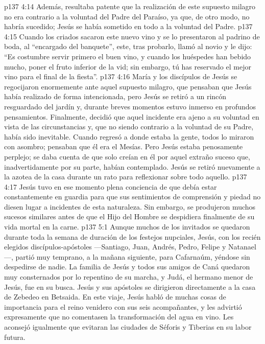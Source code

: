 \vs p137 4:14 Además, resultaba patente que la realización de este supuesto milagro no era contrario a la voluntad del Padre del Paraíso, ya que, de otro modo, no habría sucedido; Jesús se había sometido en todo a la voluntad del Padre.
\vs p137 4:15 \pc Cuando los criados sacaron este nuevo vino y se lo presentaron al padrino de boda, al “encargado del banquete”, este, tras probarlo, llamó al novio y le dijo: “Es costumbre servir primero el buen vino, y cuando los huéspedes han bebido mucho, poner el fruto inferior de la vid; sin embargo, tú has reservado el mejor vino para el final de la fiesta”.
\vs p137 4:16 María y los discípulos de Jesús se regocijaron enormemente ante aquel supuesto milagro, que pensaban que Jesús había realizado de forma intencionada, pero Jesús se retiró a un rincón resguardado del jardín y, durante breves momentos estuvo inmerso en profundos pensamientos. Finalmente, decidió que aquel incidente era ajeno a su voluntad en vista de las circunstancias y, que no siendo contrario a la voluntad de su Padre, había sido inevitable. Cuando regresó a donde estaba la gente, todos lo miraron con asombro; pensaban que él era el Mesías. Pero Jesús estaba penosamente perplejo; se daba cuenta de que solo creían en él por aquel extraño suceso que, inadvertidamente por su parte, habían contemplado. Jesús se retiró nuevamente a la azotea de la casa durante un rato para reflexionar sobre todo aquello.
\vs p137 4:17 Jesús tuvo en ese momento plena conciencia de que debía estar constantemente en guardia para que sus sentimientos de comprensión y piedad no diesen lugar a incidentes de esta naturaleza. Sin embargo, se produjeron muchos sucesos similares antes de que el Hijo del Hombre se despidiera finalmente de su vida mortal en la carne.
\vs p137 5:1 Aunque muchos de los invitados se quedaron durante toda la semana de duración de los festejos nupciales, Jesús, con los recién elegidos discípulos\hyp{}apóstoles ---Santiago, Juan, Andrés, Pedro, Felipe y Natanael---, partió muy temprano, a la mañana siguiente, para Cafarnaúm, yéndose sin despedirse de nadie. La familia de Jesús y todos sus amigos de Caná quedaron muy consternados por lo repentino de su marcha, y Judá, el hermano menor de Jesús, fue en su busca. Jesús y sus apóstoles se dirigieron directamente a la casa de Zebedeo en Betsaida. En este viaje, Jesús habló de muchas cosas de importancia para el reino venidero con sus seis acompañantes, y les advirtió expresamente que no comentasen la transformación del agua en vino. Les aconsejó igualmente que evitaran las ciudades de Séforis y Tiberias en su labor futura.
